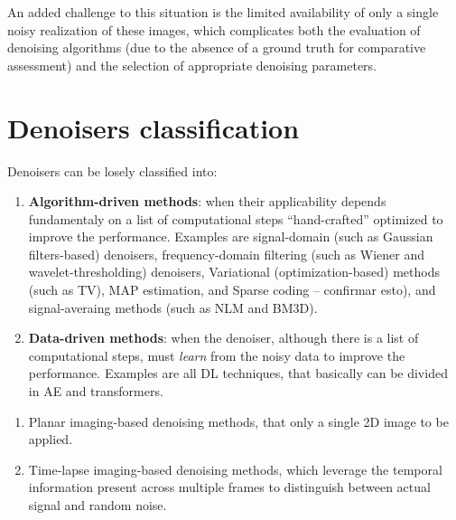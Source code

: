 An added challenge to this situation is the limited availability of
only a single noisy realization of these images, which complicates
both the evaluation of denoising algorithms (due to the absence of a
ground truth for comparative assessment) and the selection of
appropriate denoising parameters. 


\section{Denoisers classification}

Denoisers can be losely classified into:
\begin{enumerate}
\item \textbf{Algorithm-driven methods}: when their applicability
  depends fundamentaly on a list of computational steps
  ``hand-crafted'' optimized to improve the performance. Examples are
  signal-domain (such as Gaussian filters-based) denoisers,
  frequency-domain filtering (such as Wiener and wavelet-thresholding)
  denoisers, Variational (optimization-based) methods (such as \gls{TV}), MAP estimation, and Sparse coding -- confirmar
  esto), and signal-averaing methods (such as \gls{NLM} and
  \gls{BM3D}).
\item \textbf{Data-driven methods}: when the denoiser, although there
  is a list of computational steps, must \emph{learn} from the noisy
  data to improve the performance. Examples are all \gls{DL}
  techniques, that basically can be divided in \gls{AE} and
  transformers.
\end{enumerate}

\begin{enumerate}
  
\item Planar imaging-based denoising methods, that only a single 2D image to be applied.



\item Time-lapse imaging-based denoising methods, which leverage the
  temporal information present across multiple frames to distinguish
  between actual signal and random noise.
  


\end{enumerate}

